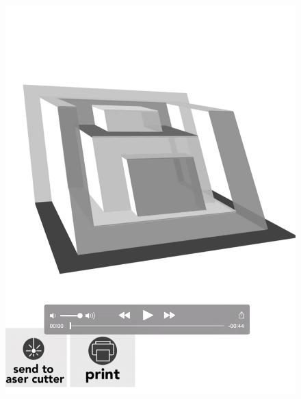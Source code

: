 \begin{figure}[htbp]
\centering
\includegraphics{figures/92_Appendix_Visual_Aids_Materials/video_card1.png}
\caption{}
\end{figure}

